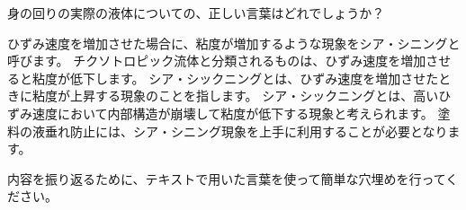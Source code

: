 \documentclass[uplatex,dvipdfmx,a4paper,11pt]{jsarticle}
\begin{document}
\begin{qlist}
	\qitem 身の回りの実際の液体についての、正しい言葉はどれでしょうか？
		\begin{qlist2}
			\qitem ひずみ速度を増加させた場合に、粘度が増加するような現象をシア・シニングと呼びます。
			\qitem チクソトロピック流体と分類されるものは、ひずみ速度を増加させると粘度が低下します。
			\qitem シア・シックニングとは、ひずみ速度を増加させたときに粘度が上昇する現象のことを指します。
			\qitem シア・シックニングとは、高いひずみ速度において内部構造が崩壊して粘度が低下する現象と考えられます。
			\qitem 塗料の液垂れ防止には、シア・シニング現象を上手に利用することが必要となります。
		\end{qlist2}

\end{qlist}

内容を振り返るために、テキストで用いた言葉を使って簡単な穴埋めを行ってください。
\end{document}
